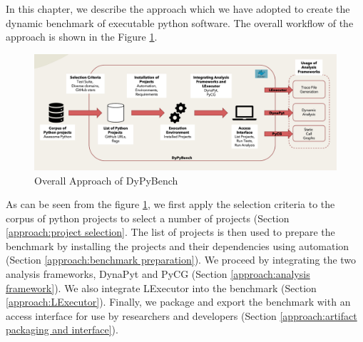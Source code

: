 In this chapter, we describe the approach which we have adopted to create the dynamic benchmark of executable python software. The overall workflow of the approach is shown in the Figure \ref{fig:overall_approach}.

\begin{figure}[ht]
\centering
\includegraphics[width=1\linewidth]{figures/approach/DyPyBench3.png}
\caption[Approach]{\label{fig:overall_approach}Overall Approach of DyPyBench}
\end{figure}

As can be seen from the figure \ref{fig:overall_approach}, we first apply the selection criteria to the corpus of python projects to select a number of projects (Section \ref{approach:project selection}.
The list of projects is then used to prepare the benchmark by installing the projects and their dependencies using automation (Section \ref{approach:benchmark preparation}).
We proceed by integrating the two analysis frameworks, DynaPyt and PyCG (Section \ref{approach:analysis framework}). 
We also integrate LExecutor into the benchmark (Section \ref{approach:LExecutor}).
Finally, we package and export the benchmark with an access interface for use by researchers and developers (Section \ref{approach:artifact packaging and interface}).   

